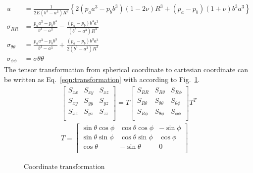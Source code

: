 \begin{subequations}
\begin{align}
  u & = \frac{1}{2E(b^3-a^3)R^2}\left\{ 2(p_aa^3-p_bb^3)(1-2\nu)R^3+(p_a-p_b)(1+\nu)b^3a^3\right\}\\
  \sigma_{RR} & = \frac{p_aa^3-p_bb^3}{b^3-a^3} - \frac{(p_a-p_b)b^3a^3}{(b^3-a^3)R^3}\\
  \sigma_{\theta\theta} & = \frac{p_aa^3-p_bb^3}{b^3-a^3} + \frac{(p_a-p_b)b^3a^3}{2(b^3-a^3)R^3}\\
  \sigma_{\phi\phi} & = \sigma{\theta\theta}
  \label{oct_eq:ex_hollow_sphere_ana_sol}
\end{align}
\end{subequations}
The tensor transformation from spherical coordinate to cartesian coordinate can be written as Eq.~\ref{eqn:transformation} with according to Fig.~\ref{octree_fig:oct_ex_hollow_sphere_tran}.
\begin{subequations}
  \begin{align}
    \begin{bmatrix}
      S_{xx} & S_{xy} & S_{xz} \\
      S_{xy} & S_{yy} & S_{yz} \\
      S_{xz} & S_{yz} & S_{zz} \\
    \end{bmatrix} = T\begin{bmatrix}
      S_{RR} & S_{R\theta} & S_{R\phi} \\
      S_{R\theta} & S_{\theta\theta} & S_{\theta\phi}\\
      S_{R\phi} & S_{\theta\phi} & S_{\phi\phi} \\
    \end{bmatrix} T^T\\
  T = 
\begin{bmatrix}
\sin\theta\cos\phi & \cos\theta\cos\phi & -\sin\phi \\
\sin\theta\sin\phi & \cos\theta\sin\phi & \cos\phi  \\
\cos\theta & -\sin\theta & 0 \\
\end{bmatrix}
\end{align}
\label{eqn:transformation}
\end{subequations}
%
\begin{figure}[h!]
    \centering
    \caption{Coordinate transformation}
    \label{octree_fig:oct_ex_hollow_sphere_tran}
  \end{figure}
